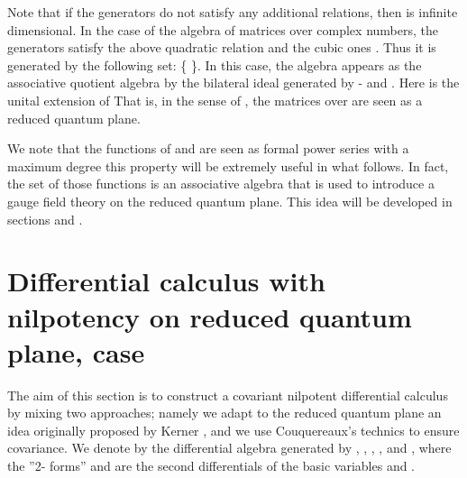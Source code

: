 \documentclass[a4paper,12pt,thmsa]{article}
\begin{document}
Note that if the generators \coordHE{}  \coordHE{} do not satisfy any additional
relations, then \coordHE{} is infinite dimensional. In the case of the algebra \coordHE{} of \coordHE{} matrices over complex numbers, the generators \coordHE{}  \coordHE{}
satisfy the above quadratic relation and the cubic ones \coordHE{}. Thus it
is generated by the following set: \{\coordHE{}  \coordHE{}  \coordHE{}  \coordHE{}  \coordHE{}  \coordHE{}  \coordHE{}  \coordHE{}  \coordHE{}\}. In this case, the algebra \coordHE{} appears as the
associative quotient algebra \coordHE{} by the bilateral ideal generated by \coordHE{}-\coordHE{} and \coordHE{}. Here \coordHE{} is the unital extension of \coordHE{}
That is, in the sense of \myHighlight{$\left[ 6,11\right] $}\coordHE{}, the \coordHE{} matrices
over \coordHE{} are seen as a reduced quantum plane. \

We note that the functions of \coordHE{} and \coordHE{} are seen as formal power series
with a maximum degree \coordHE{} this property will be extremely useful in what
follows. In fact, the set of those functions is an associative algebra that
is used to introduce a gauge field theory on the reduced quantum plane. This
idea will be developed in sections \coordHE{} and \coordHE{}.

\section{Differential calculus with nilpotency \coordHE{} on reduced quantum
plane, case \coordHE{}}

The aim of this section is to construct a covariant \coordHE{} nilpotent
differential calculus by mixing two approaches; namely we adapt to the
reduced quantum plane an idea originally proposed by Kerner \myHighlight{$[1-3]$}\coordHE{}, and we
use Couquereaux's technics \myHighlight{$[6]$}\coordHE{} to ensure covariance. We denote by \myHighlight{$\Omega $}\coordHE{}
the differential algebra generated by \coordHE{}, \coordHE{}, \coordHE{}, \coordHE{}, \coordHE{} and \coordHE{}, where the ''2- forms'' \coordHE{} and \coordHE{} are the second differentials
of the basic variables \coordHE{} and \coordHE{}.
\end{document}

